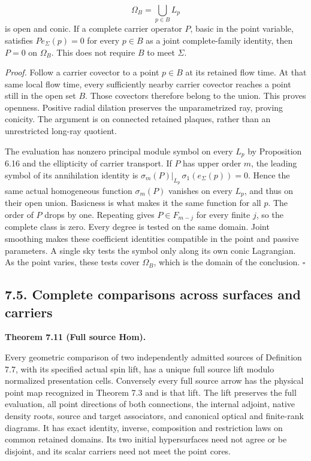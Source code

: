 \documentclass[
  english,
  11pt,
  reqno]{amsart}
\makeatletter
\newcommand{\pandocstatementheading}[1]{%
  \par\addpenalty{\@beginparpenalty}%
  \addvspace{.5\baselineskip plus .2\baselineskip minus .2\baselineskip}%
  {\normalfont\bfseries #1\par}%
  \nobreak\@afterindenttrue\@afterheading
}
\makeatother
\begin{document}
\label{eq:online-tested-open-ray-domain} \[
\Omega_B=\bigcup_{p\in B}L_p
\] is open and conic. If a complete carrier operator \(P\), basic in the
point variable, satisfies \(P e_\Sigma(p)=0\) for every \(p\in B\) as a
joint complete-family identity, then \(P=0\) on \(\Omega_B\). This does
not require \(B\) to meet \(\Sigma\).

\emph{Proof.} Follow a carrier covector to a point \(p\in B\) at its
retained flow time. At that same local flow time, every sufficiently
nearby carrier covector reaches a point still in the open set \(B\).
Those covectors therefore belong to the union. This proves openness.
Positive radial dilation preserves the unparametrized ray, proving
conicity. The argument is on connected retained plaques, rather than an
unrestricted long-ray quotient.

The evaluation has nonzero principal module symbol on every \(L_p\) by
Proposition 6.16 and the ellipticity of carrier transport. If \(P\) has
upper order \(m\), the leading symbol of its annihilation identity is
\(\sigma_m(P)|_{L_p}\,\sigma_1(e_\Sigma(p))=0\). Hence the same actual
homogeneous function \(\sigma_m(P)\) vanishes on every \(L_p\), and thus
on their open union. Basicness is what makes it the same function for
all \(p\). The order of \(P\) drops by one. Repeating gives
\(P\in F_{m-j}\) for every finite \(j\), so the complete class is zero.
Every degree is tested on the same domain. Joint smoothing makes these
coefficient identities compatible in the point and passive parameters. A
single sky tests the symbol only along its own conic Lagrangian. As the
point varies, these tests cover \(\Omega_B\), which is the domain of the
conclusion. \hfill\(\square\)

\subsection{7.5. Complete comparisons across surfaces and
carriers}\label{complete-comparisons-across-surfaces-and-carriers}\label{sec:online-full-unmarked-hom}

\pandocstatementheading{\leavevmode{}\label{thm:online-full-unmarked-source-hom}Theorem 7.11 (Full source Hom).}

Every geometric comparison of two independently admitted sources of
Definition 7.7, with its specified actual spin lift, has a unique full
source lift modulo normalized presentation cells. Conversely every full
source arrow has the physical point map recognized in Theorem 7.3 and is
that lift. The lift preserves the full evaluation, all point directions
of both connections, the internal adjoint, native density roots, source
and target associators, and canonical optical and finite-rank diagrams.
It has exact identity, inverse, composition and restriction laws on
common retained domains. Its two initial hypersurfaces need not agree or
be disjoint, and its scalar carriers need not meet the point cores.
\end{document}
